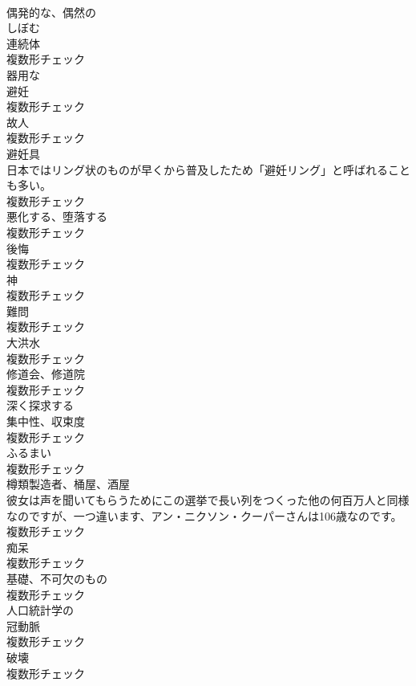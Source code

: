 \documentclass[8pt]{extreport}
\begin{document}
\begin{CJK}{UTF8}{min}
\\	[形容詞]	偶発的な、偶然の	
\\	[動詞]	しぼむ	
\\	[名詞]	連続体	
\\	複数形チェック
\\	[形容詞]	器用な	
\\	[名詞]	避妊	
\\	複数形チェック
\\	[名詞]	故人	
\\	複数形チェック
\\	[名詞]	避妊具	
\\	日本ではリング状のものが早くから普及したため「避妊リング」と呼ばれることも多い。	
\\	複数形チェック
\\	[名詞]	悪化する、堕落する	
\\	複数形チェック
\\	[名詞]	後悔	
\\	複数形チェック
\\	[名詞]	神	
\\	複数形チェック
\\	[名詞]	難問	
\\	複数形チェック
\\	[名詞]	大洪水	
\\	複数形チェック
\\	[名詞]	修道会、修道院	
\\	複数形チェック
\\	[動詞]	深く探求する	
\\	[名詞]	集中性、収束度	
\\	複数形チェック
\\	[名詞]	ふるまい	
\\	複数形チェック
\\	[名詞]	樽類製造者、桶屋、酒屋	
\\	彼女は声を聞いてもらうためにこの選挙で長い列をつくった他の何百万人と同様なのですが、一つ違います、アン・ニクソン・クーパーさんは106歳なのです。	
\\	複数形チェック
\\	[名詞]	痴呆	
\\	複数形チェック
\\	[名詞]	基礎、不可欠のもの	
\\	複数形チェック
\\	[形容詞]	人口統計学の	
\\	[名詞]	冠動脈	
\\	複数形チェック
\\	[名詞]	破壊	
\\	複数形チェック

\end{CJK}
\end{document}
